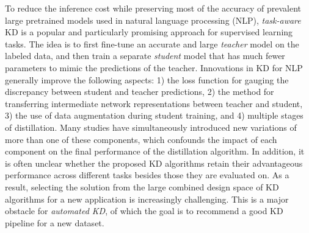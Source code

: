 \documentclass[11pt]{article}
\begin{document}
To reduce the inference cost while preserving most of the accuracy of prevalent large pretrained models used in natural language processing (NLP), \emph{task-aware} KD is a popular and particularly promising approach for supervised learning tasks. The idea is to first fine-tune an accurate and large \emph{teacher} model on the labeled data, and then train a separate \emph{student} model that has much fewer parameters to mimic the predictions of the teacher. Innovations in KD for NLP generally improve the following aspects: 1) the loss function for gauging the discrepancy between student and teacher predictions, 2) the method for transferring intermediate network representations between teacher and student, 3) the use of data augmentation during student training, and 4) multiple stages of  distillation. Many studies have simultaneously introduced new variations of more than one of these components, which confounds the impact of each component on the final performance of the distillation algorithm. In addition, it is often unclear whether the proposed KD algorithms retain their advantageous performance across different tasks besides those they are evaluated on. As a result, selecting the solution from the large combined design space of KD algorithms for a new application is increasingly challenging. This is a major obstacle for \emph{automated KD}, of which the goal is to recommend a good KD pipeline for a new dataset.
\end{document}
